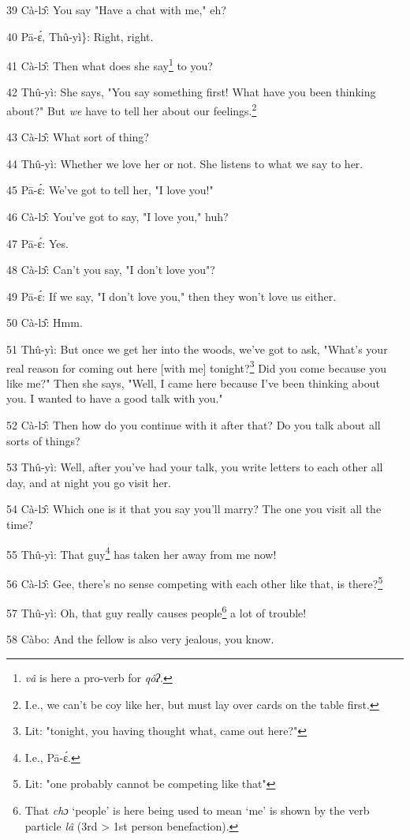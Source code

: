 39 Cà-lɔ̂: You say "Have a chat with me," eh?

40 Pā-ɛ́, Thû-yì\}: Right, right.

41 Cà-lɔ̂: Then what does she say\footnote{\textit{vâ }is here a pro-verb for \textit{qôʔ}.} to you?

42 Thû-yì: She says, "You say something first! What have you been thinking
about?" But \textit{we} have to tell her about our feelings.\footnote{I.e., we can't be coy like her, but must lay over cards on the table first.}

43 Cà-lɔ̂: What sort of thing?

44 Thû-yì: Whether we love her or not. She listens to what we say to her.

45 Pā-ɛ́: We've got to tell her, "I love you!"

46 Cà-lɔ̂: You've got to say, "I love you," huh?

47 Pā-ɛ́: Yes.

48 Cà-lɔ̂: Can't you say, "I don't love you"?

49 Pā-ɛ́: If we say, "I don't love you," then they won't
love us either.

50 Cà-lɔ̂: Hmm.

51 Thû-yì: But once we get her into the woods, we've got to ask, "What's
your real reason for coming out here [with me] tonight?\footnote{Lit: "tonight, you having thought what, came out here?"} Did you come because
you like me?" Then she says, "Well, I came here because I've
been thinking about you. I wanted to have a good talk with you."

52 Cà-lɔ̂: Then how do you continue with it after that? Do you talk about all
sorts of things?

53 Thû-yì: Well, after you've had your talk, you write letters to each other
all day, and at night you go visit her.

54 Cà-lɔ̂: Which one is it that you say you'll marry? The one you visit all
the time?

55 Thû-yì: That guy\footnote{I.e., Pā-ɛ́.} has taken her away from me now!

56 Cà-lɔ̂: Gee, there's no sense competing with each other like that, is there?\footnote{Lit: "one probably cannot be competing like that"}

57 Thû-yì: Oh, that guy really causes people\footnote{That \textit{chɔ} `people' is here being used to mean `me' is shown by the verb particle \textit{lâ} (3rd > 1st person benefaction).} a lot of trouble!

58 Càbo: And the fellow is also very jealous, you know.

